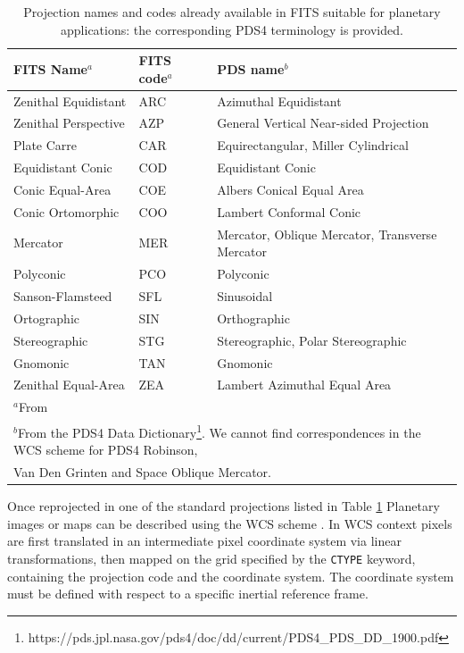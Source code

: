 \begin{table}
\label{table:proj}
\caption{Projection names and codes already available in FITS suitable for
planetary applications: the corresponding PDS4 terminology is
provided.}
\centering
\begin{tabular}{l l l}
\hline
FITS Name$^{a}$ & FITS code$^{a}$ & PDS name$^{b}$ \\ 
\hline
Zenithal Equidistant & ARC & Azimuthal Equidistant \\
Zenithal Perspective & AZP & General Vertical Near-sided Projection \\
Plate Carre & CAR & Equirectangular, Miller Cylindrical \\
Equidistant Conic & COD & Equidistant Conic \\
Conic Equal-Area & COE & Albers Conical Equal Area \\ 
Conic Ortomorphic & COO & Lambert Conformal Conic\\
Mercator & MER & Mercator, Oblique Mercator, Transverse Mercator \\
Polyconic & PCO & Polyconic \\
Sanson-Flamsteed & SFL & Sinusoidal \\
Ortographic & SIN & Orthographic \\
Stereographic & STG & Stereographic, Polar Stereographic \\
Gnomonic & TAN & Gnomonic \\
Zenithal Equal-Area & ZEA & Lambert Azimuthal Equal Area \\
\hline
\multicolumn{3}{l}{$^{a}$From \citet{calagreisenI}} \\
\multicolumn{3}{l}{$^{b}$From the PDS4 Data Dictionary\footnote{https://pds.jpl.nasa.gov/pds4/doc/dd/current/PDS4\_PDS\_DD\_1900.pdf}. We cannot find correspondences in the WCS scheme for PDS4 Robinson,} \\
\multicolumn{3}{l}{Van Den Grinten and Space Oblique Mercator.}
\end{tabular}
\end{table}

Once reprojected in one of the standard projections listed in Table \ref{table:proj}
Planetary images or maps can be described using the WCS scheme
\citep{greisencalaII,calagreisenI}.
In WCS context pixels are first translated in an intermediate pixel coordinate system
via linear transformations, then mapped on the grid specified by the \texttt{CTYPE}
keyword, containing the projection code and the coordinate system.
The coordinate system must be defined with respect to a specific inertial reference frame.

